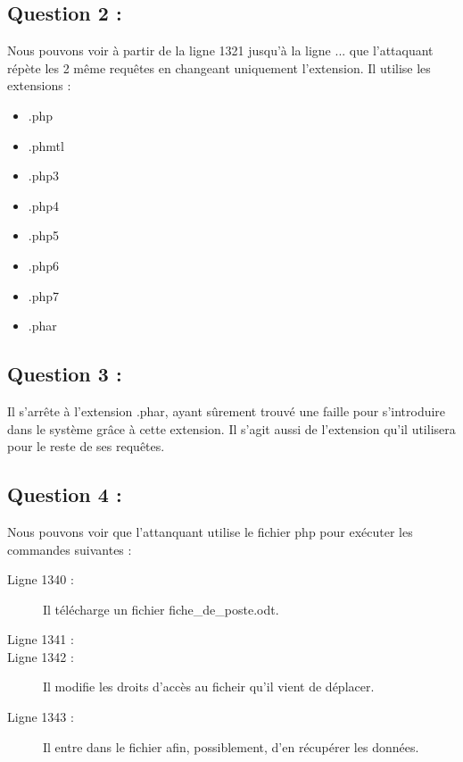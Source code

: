\documentclass{article}
\begin{document}
    \subsection{Question 2 :}
        Nous pouvons voir à partir de la ligne 1321 jusqu'à la ligne ... que l'attaquant répète les 2 même requêtes en changeant uniquement l'extension.
        Il utilise les extensions :
        \begin{itemize}
            \item .php
            \item .phmtl
            \item .php3
            \item .php4
            \item .php5
            \item .php6
            \item .php7
            \item .phar
        \end{itemize}
    \subsection{Question 3 :}
        Il s'arrête à l'extension .phar, ayant sûrement trouvé une faille pour s'introduire dans le système grâce à cette extension.
        Il s'agit aussi de l'extension qu'il utilisera pour le reste de ses requêtes.
    \subsection{Question 4 :}
        Nous pouvons voir que l'attanquant utilise le fichier php pour exécuter les commandes suivantes :
        \begin{description}
            \item[Ligne 1340 :] Il télécharge un fichier fiche\_de\_poste.odt.
            \item[Ligne 1341 :] 
            \item[Ligne 1342 :] Il modifie les droits d'accès au ficheir qu'il vient de déplacer.
            \item[Ligne 1343 :] Il entre dans le fichier afin, possiblement, d'en récupérer les données.
        \end{description}
\end{document}
